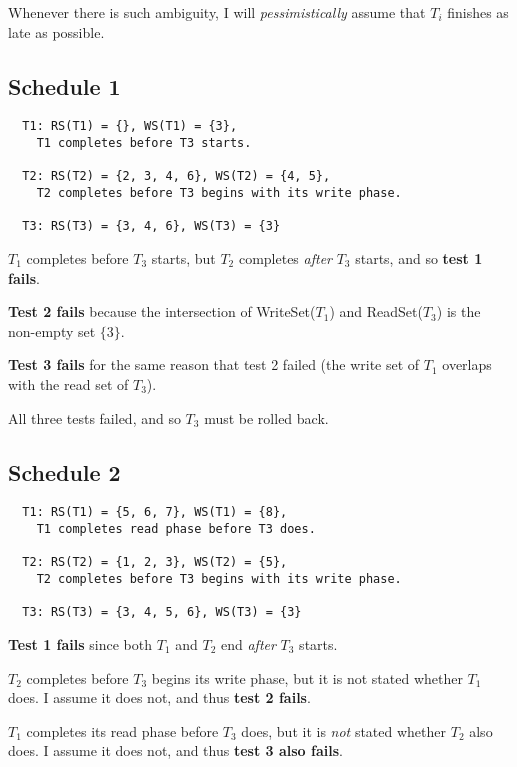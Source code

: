 Whenever there is such ambiguity, I will \textit{pessimistically} assume that
$T_i$ finishes as late as possible.


\subsection{Schedule 1}
\begin{verbatim}
  T1: RS(T1) = {}, WS(T1) = {3},
    T1 completes before T3 starts.

  T2: RS(T2) = {2, 3, 4, 6}, WS(T2) = {4, 5},
    T2 completes before T3 begins with its write phase.

  T3: RS(T3) = {3, 4, 6}, WS(T3) = {3}
\end{verbatim}

$T_1$ completes before $T_3$ starts, but $T_2$ completes \textit{after} $T_3$
starts, and so \textbf{test 1 fails}. \medskip

\textbf{Test 2 fails} because the intersection of WriteSet($T_1$) and ReadSet($T_3$)
is the non-empty set $\{3\}$. \medskip

\textbf{Test 3 fails} for the same reason that test 2 failed (the write set of $T_1$
overlaps with the read set of $T_3$). \bigskip

All three tests failed, and so $T_3$ must be rolled back.

\subsection{Schedule 2}

\begin{verbatim}
  T1: RS(T1) = {5, 6, 7}, WS(T1) = {8},
    T1 completes read phase before T3 does.

  T2: RS(T2) = {1, 2, 3}, WS(T2) = {5},
    T2 completes before T3 begins with its write phase.

  T3: RS(T3) = {3, 4, 5, 6}, WS(T3) = {3}
\end{verbatim}

\textbf{Test 1 fails} since both $T_1$ and $T_2$ end \textit{after} $T_3$ starts.
\medskip

$T_2$ completes before $T_3$ begins its write phase, but it is not stated
whether $T_1$ does. I assume it does not, and thus \textbf{test 2 fails}.
\medskip

$T_1$ completes its read phase before $T_3$ does, but it is \textit{not} stated
whether $T_2$ also does. I assume it does not, and thus \textbf{test 3 also
fails}.

